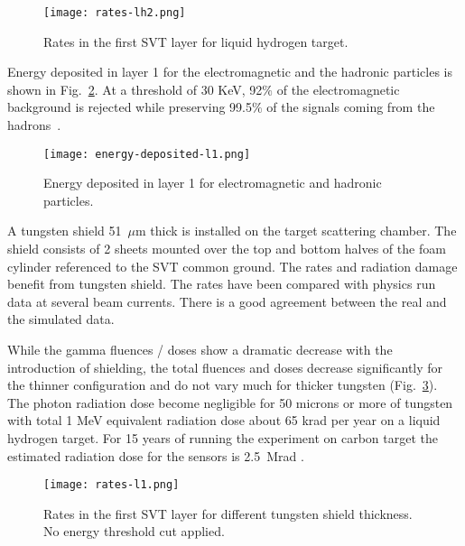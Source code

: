 \begin{figure}[hbt] 
\centering 
\texttt{[image: rates-lh2.png]}
\caption{Rates in the first SVT layer for liquid hydrogen target.}
\label{fig:rates-lh2}
\end{figure}

Energy deposited in layer 1 for the electromagnetic and the hadronic particles is shown in Fig.~\ref{fig:energy-deposited-l1}. At a threshold of 30 KeV, 92$\%$ of the electromagnetic background is rejected while preserving  99.5$\%$ of the signals coming from the hadrons~\cite{TDRSVT}.

\begin{figure}[hbt] 
\centering 
\texttt{[image: energy-deposited-l1.png]}
\caption{Energy deposited in layer 1 for electromagnetic and hadronic particles.}
\label{fig:energy-deposited-l1}
\end{figure}

A tungsten shield 51~$\mu$m thick is installed on the target scattering chamber. The shield consists of 2 sheets mounted over the top and bottom halves of the foam cylinder referenced to the SVT common ground. The rates and radiation damage benefit from tungsten shield. The rates have been compared with physics run data at several beam currents. There is a good agreement between the real and the simulated data.

While the gamma fluences / doses show a dramatic decrease with the introduction of shielding, the total fluences and doses decrease significantly for the thinner configuration and do not vary much for thicker tungsten (Fig.~\ref{fig:rates-l1}). The photon radiation dose become negligible for 50 microns or more of tungsten with total 1 MeV equivalent radiation dose about 65 krad per year on a liquid hydrogen target. For 15 years of running the experiment on carbon target the estimated radiation dose for the sensors is 2.5~Mrad \cite{TDRSVT}. 

\begin{figure}[hbt] 
\centering 
\texttt{[image: rates-l1.png]}
\caption{Rates in the first SVT layer for different tungsten shield thickness. No energy threshold cut applied.}
\label{fig:rates-l1}
\end{figure}


